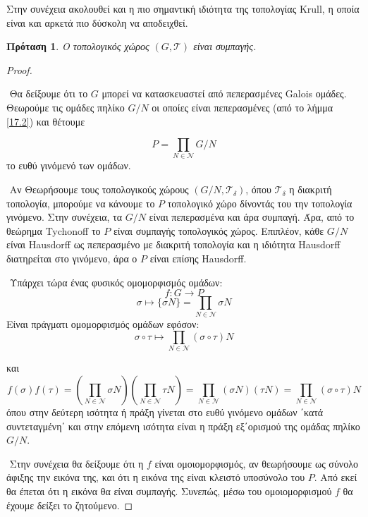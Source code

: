 \documentclass[oneside,a4paper]{article}
\newtheorem{prop}{Πρόταση}
\newcommand {\tl}{\textlatin}
\begin{document}
\noindent Στην συνέχεια ακολουθεί και η πιο σημαντική ιδιότητα της τοπολογίας \tl{Krull}, η οποία είναι και αρκετά πιο δύσκολη να αποδειχθεί.
\begin{prop}O τοπολογικός χώρος $(G, \mathcal{T})$ είναι συμπαγής.
\end{prop}
\begin{proof} $ $


$ $\newline
Θα δείξουμε ότι το $G$ μπορεί να κατασκευαστεί από πεπερασμένες \tl{Galois} ομάδες. Θεωρούμε τις ομάδες πηλίκο $G/N$ οι οποίες είναι πεπερασμένες (από το λήμμα \ref{17.2}) και θέτουμε

$$P = \prod\limits_{N \in \mathcal{N}} G/N$$
το ευθύ γινόμενό των ομάδων.

$ $\newline
\noindent Αν Θεωρήσουμε τους τοπολογικούς χώρους $(G/N, \mathcal{T}_{\delta})$, όπου $\mathcal{T}_{\delta}$ η διακριτή τοπολογία, μπορούμε να κάνουμε το $P$ τοπολογικό χώρο δίνοντάς του την τοπολογία γινόμενο. Στην συνέχεια, τα $G/N$ είναι πεπερασμένα και άρα συμπαγή. Άρα, από το θεώρημα \tl{Tychonoff} το $P$ είναι συμπαγής τοπολογικός χώρος. Επιπλέον, κάθε $G/N$ είναι \tl{Hausdorff} ως πεπερασμένο με διακριτή τοπολογία και η ιδιότητα \tl{Hausdorff} διατηρείται στο γινόμενο, άρα ο $P$ είναι επίσης \tl{Hausdorff}.

$ $\newline
\noindent Υπάρχει τώρα ένας φυσικός ομομορφισμός ομάδων:
$$f:G \longrightarrow P$$
$$\sigma \longmapsto \{\sigma N \} = \prod\limits_{N \in \mathcal{N}} \sigma N$$
Είναι πράγματι ομομορφισμός ομάδων εφόσον:
$$\sigma \circ \tau \longmapsto \prod\limits_{N \in \mathcal{N}} (\sigma \circ \tau) N$$

και 
$$f(\sigma)f(\tau) = \left( \prod\limits_{N \in \mathcal{N}} \sigma N \right) \left(\prod\limits_{N \in \mathcal{N}}\tau N \right) = \prod\limits_{N \in \mathcal{N}} (\sigma N)(\tau N) = \prod\limits_{N \in \mathcal{N}} (\sigma \circ \tau)N$$
όπου στην δεύτερη ισότητα ή πράξη γίνεται στο ευθύ γινόμενο ομάδων ΄κατά συντεταγμένη΄ και στην επόμενη ισότητα είναι η πράξη εξ΄ορισμού της ομάδας πηλίκο $G/N$.

$ $\newline
\noindent Στην συνέχεια θα δείξουμε ότι η $f$ είναι ομοιομορφισμός, αν θεωρήσουμε ως σύνολο άφιξης
την εικόνα της, και ότι η εικόνα της είναι κλειστό υποσύνολο του $P$. Από εκεί θα έπεται ότι η εικόνα θα είναι συμπαγής. Συνεπώς, μέσω του ομοιομορφισμού $f$ θα έχουμε δείξει το ζητούμενο.


\end{proof}
\end{document}
